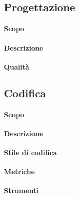 \subsection{Progettazione}
\paragraph{Scopo}
\paragraph{Descrizione}
\paragraph{Qualità}
\subsection{Codifica}
\paragraph{Scopo}
\paragraph{Descrizione}
\paragraph{Stile di codifica}
\paragraph{Metriche}
\paragraph{Strumenti}
